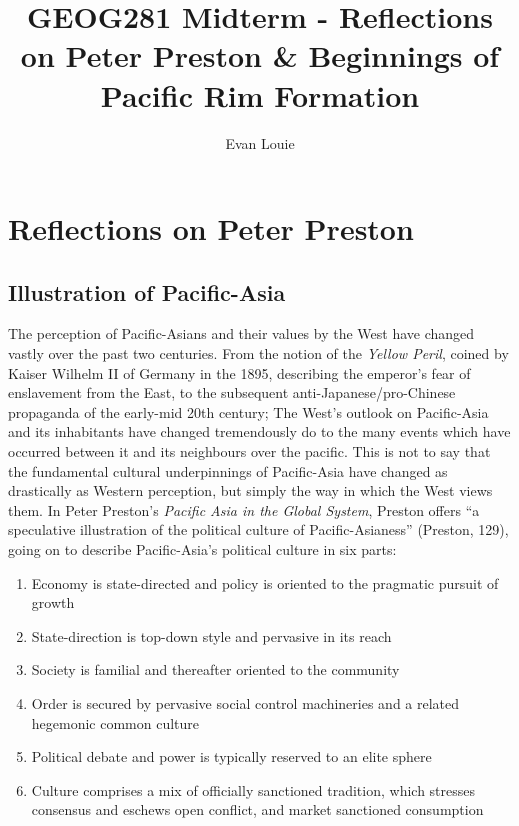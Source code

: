\documentclass[man,donotrepeattitle,letter]{apa6}
\title{GEOG281 Midterm - Reflections on Peter Preston \& Beginnings of Pacific Rim Formation}
\author{Evan Louie}
\affiliation{University of British Columbia}
\begin{document}
\maketitle

\tableofcontents
\newpage
\section{Reflections on Peter Preston}

\subsection{Illustration of Pacific-Asia}
The perception of Pacific-Asians and their values by the West have changed vastly over the past two centuries.  From the notion of the \textit{Yellow Peril}, coined by Kaiser Wilhelm II of Germany in the 1895, describing the emperor's fear of enslavement from the East, to the subsequent anti-Japanese/pro-Chinese propaganda of the early-mid 20th century; The West's outlook on Pacific-Asia and its inhabitants have changed tremendously do to the many events which have occurred between it and its neighbours over the pacific.  This is not to say that the fundamental cultural underpinnings of Pacific-Asia have changed as drastically as Western perception, but simply the way in which the West views them. In Peter Preston's \textit{Pacific Asia in the Global System}, Preston offers ``a speculative illustration of the political culture of Pacific-Asianess'' (Preston, 129), going on to describe Pacific-Asia's political culture in six parts:

\begin{enumerate}
  \item Economy is state-directed and policy is oriented to the pragmatic pursuit of growth
  \item State-direction is top-down style and pervasive in its reach
  \item Society is familial and thereafter oriented to the community
  \item Order is secured by pervasive social control machineries and a related hegemonic common culture
  \item Political debate and power is typically reserved to an elite sphere
  \item Culture comprises a mix of officially sanctioned tradition, which stresses consensus and eschews open conflict, and market sanctioned consumption
\end{enumerate}
\end{document}
